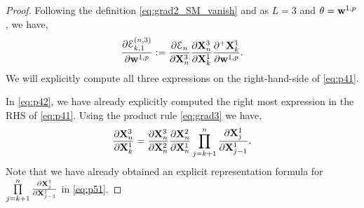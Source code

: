 \documentclass{article}
\newcommand{\bw}{{\bf w}}
\newcommand{\bX}{{\bf X}}
\newcommand{\E}{\EuScript{E}}
\begin{document}
\begin{proof}
Following the definition \eqref{eq:grad2_SM_vanish} and as $L=3$ and $\theta = \bw^{1,p}$, we have,
\begin{equation}
    \label{eq:p41}
    \frac{\partial \E^{(n,3)}_{k,1}}{\partial \bw^{1,p}} := \frac{\partial \E_n}{\partial \bX^3_n} \frac{\partial \bX^3_n}{\partial \bX^1_k} \frac{\partial^{+} \bX^1_k}{\partial \bw^{1,p}}.
\end{equation}
We will explicitly compute all three expressions on the right-hand-side of \eqref{eq:p41}.

In \eqref{eq:p42}, we have already explicitly computed the right most expression in the RHS of \eqref{eq:p41}. 
Using the product rule \eqref{eq:grad3} we have,
\begin{equation}
\label{eq:p43}
 \frac{\partial \bX^3_n}{\partial \bX^1_k} = \frac{\partial \bX^3_n}{\partial \bX^2_n} \frac{\partial \bX^2_n}{\partial \bX^1_n}\prod\limits_{j=k+1}^n  \frac{\partial \bX^1_j}{\partial \bX^1_{j-1}}. 
\end{equation}
Note that we have already obtained an explicit representation formula for $\prod\limits_{j=k+1}^n  \frac{\partial \bX^1_j}{\partial \bX^1_{j-1}} $ in \eqref{eq:p51}. 


\end{proof}
\end{document}
